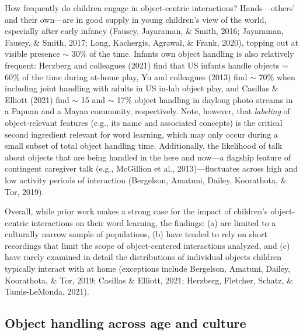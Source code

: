 \documentclass[10pt, letterpaper]{article}
\begin{document}
How frequently do children engage in object-centric interactions?
Hands---others' and their own---are in good supply in young children's
view of the world, especially after early infancy (Fausey, Jayaraman, \&
Smith, 2016; Jayaraman, Fausey, \& Smith, 2017; Long, Kachergis,
Agrawal, \& Frank, 2020), topping out at visible presence \(\sim\) 30\%
of the time. Infants own object handling is also relatively frequent:
Herzberg and colleagues (2021) find that US infants handle objects
\(\sim\) 60\% of the time during at-home play, Yu and colleagues (2013)
find \(\sim\) 70\% when including joint handling with adults in US
in-lab object play, and Casillas \& Elliott (2021) find \(\sim\) 15 and
\(\sim\) 17\% object handling in daylong photo streams in a Papuan and a
Mayan community, respectively. Note, however, that \emph{labeling} of
object-relevant features (e.g., its name and associated concepts) is the
critical second ingredient relevant for word learning, which may only
occur during a small subset of total object handling time. Additionally,
the likelihood of talk about objects that are being handled in the here
and now---a flagship feature of contingent caregiver talk (e.g.,
McGillion et al., 2013)---fluctuates across high and low activity
periods of interaction (Bergelson, Amatuni, Dailey, Koorathota, \& Tor,
2019).

Overall, while prior work makes a strong case for the impact of
children's object-centric interactions on their word learning, the
findings: (a) are limited to a culturally narrow sample of populations,
(b) have tended to rely on short recordings that limit the scope of
object-centered interactions analyzed, and (c) have rarely examined in
detail the distributions of individual objects children typically
interact with at home (exceptions include Bergelson, Amatuni, Dailey,
Koorathota, \& Tor, 2019; Casillas \& Elliott, 2021; Herzberg, Fletcher,
Schatz, \& Tamis-LeMonda, 2021).

\hypertarget{object-handling-across-age-and-culture}{%
\subsection{Object handling across age and
culture}\label{object-handling-across-age-and-culture}}
\end{document}

